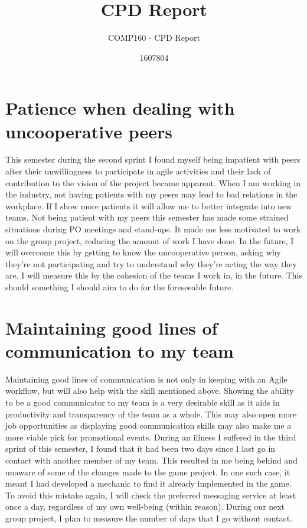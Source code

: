 \documentclass{scrartcl}
\title{CPD Report}
\subtitle{COMP160 - CPD Report}
\author{1607804}
\begin{document}
\maketitle

\section{Patience when dealing with uncooperative peers}This semester during the second sprint I found myself being impatient with peers after their unwillingness to participate in agile activities and their lack of contribution to the vision of the project became apparent. When I am working in the industry, not having patients with my peers may lead to bad relations in the workplace. If I show more patients it will allow me to better integrate into new teams. Not being patient with my peers this semester has made some strained situations during PO meetings and stand-ups. It made me less motivated to work on the group project, reducing the amount of work I have done. In the future, I will overcome this by getting to know the uncooperative person, asking why they're not participating and try to understand why they're acting the way they are. I will measure this by the cohesion of the teams I work in, in the future. This should something I should aim to do for the foreseeable future. 

\section{Maintaining good lines of communication to my team}
Maintaining good lines of communication is not only in keeping with an Agile workflow, but will also help with the skill mentioned above. Showing the ability to be a good communicator to my team is a very desirable skill as it aids in productivity and transparency of the team as a whole. This may also open more job opportunities as displaying good communication skills may also make me a more viable pick for promotional events. During an illness I suffered in the third sprint of this semester, I found that it had been two days since I last go in contact with another member of my team. This resulted in me being behind and unaware of some of the changes made to the game project. In one such case, it meant I had developed a mechanic to find it already implemented in the game. To avoid this mistake again, I will check the preferred messaging service at least once a day, regardless of my own well-being (within reason). During our next group project, I plan to measure the number of days that I go without contact. 
\end{document}
